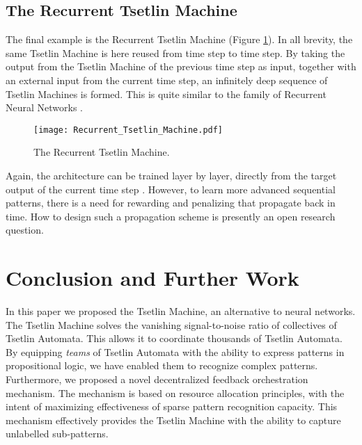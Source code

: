 \documentclass[11pt,a4paper]{article}
\begin{document}
\subsection{The Recurrent Tsetlin Machine}

The final example is the Recurrent Tsetlin Machine \cite{Granmo2018c} (Figure \ref{figure:recurrent_tsetlin_machine}). In all brevity, the same Tsetlin Machine is here reused from time step to time step. By taking the output from the Tsetlin Machine of the previous time step as input, together with an external input from the current time step, an infinitely deep sequence of Tsetlin Machines is formed. This is quite similar to the family of Recurrent Neural Networks \cite{Schmidhuber2015}.
\begin{figure}[!th]
\centering
\texttt{[image: Recurrent\_Tsetlin\_Machine.pdf]}
\caption{The Recurrent Tsetlin Machine.}
\label{figure:recurrent_tsetlin_machine}
\end{figure}
Again, the architecture can be trained layer by layer, directly from the target output  of the current time step . However, to learn more advanced sequential patterns, there is a need for rewarding and penalizing that propagate back in time. How to design such a propagation scheme is presently an open research question.

\section{Conclusion and Further Work}
\label{sec:conclusion}

In this paper we proposed the Tsetlin Machine, an alternative to neural networks. The Tsetlin Machine solves the vanishing signal-to-noise ratio of collectives of Tsetlin Automata. This allows it to coordinate thousands of Tsetlin Automata. By equipping \emph{teams} of Tsetlin Automata with the ability to express patterns in propositional logic, we have enabled them to recognize complex patterns. Furthermore, we proposed a novel decentralized feedback orchestration mechanism. The mechanism is based on resource allocation principles, with the intent of maximizing effectiveness of sparse pattern recognition capacity. This mechanism effectively provides the Tsetlin Machine with the ability to capture unlabelled sub-patterns.
\end{document}
